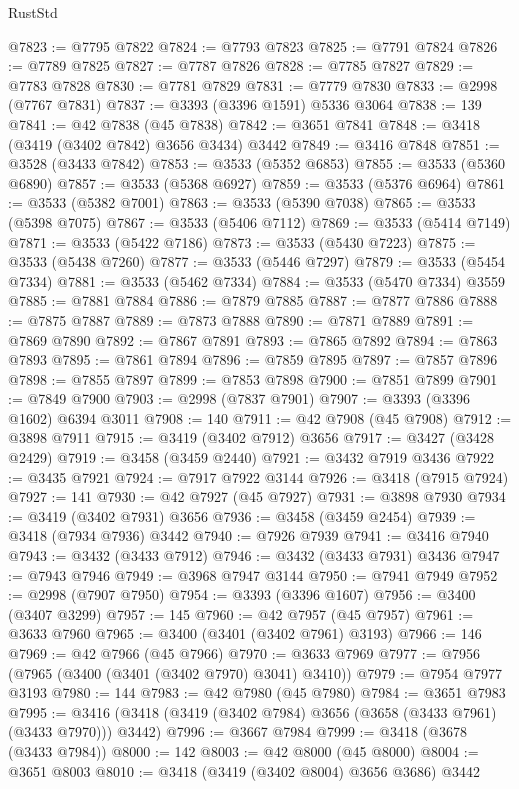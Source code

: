 \begin{lexlean}{RustStd}
\begin{coremodule}
@7823 := @7795 @7822
@7824 := @7793 @7823
@7825 := @7791 @7824
@7826 := @7789 @7825
@7827 := @7787 @7826
@7828 := @7785 @7827
@7829 := @7783 @7828
@7830 := @7781 @7829
@7831 := @7779 @7830
@7833 := @2998 (@7767 @7831)
@7837 := @3393 (@3396 @1591) @5336 @3064
@7838 := 139
@7841 := @42 @7838 (@45 @7838)
@7842 := @3651 @7841
@7848 := @3418 (@3419 (@3402 @7842) @3656 @3434) @3442
@7849 := @3416 @7848
@7851 := @3528 (@3433 @7842)
@7853 := @3533 (@5352 @6853)
@7855 := @3533 (@5360 @6890)
@7857 := @3533 (@5368 @6927)
@7859 := @3533 (@5376 @6964)
@7861 := @3533 (@5382 @7001)
@7863 := @3533 (@5390 @7038)
@7865 := @3533 (@5398 @7075)
@7867 := @3533 (@5406 @7112)
@7869 := @3533 (@5414 @7149)
@7871 := @3533 (@5422 @7186)
@7873 := @3533 (@5430 @7223)
@7875 := @3533 (@5438 @7260)
@7877 := @3533 (@5446 @7297)
@7879 := @3533 (@5454 @7334)
@7881 := @3533 (@5462 @7334)
@7884 := @3533 (@5470 @7334) @3559
@7885 := @7881 @7884
@7886 := @7879 @7885
@7887 := @7877 @7886
@7888 := @7875 @7887
@7889 := @7873 @7888
@7890 := @7871 @7889
@7891 := @7869 @7890
@7892 := @7867 @7891
@7893 := @7865 @7892
@7894 := @7863 @7893
@7895 := @7861 @7894
@7896 := @7859 @7895
@7897 := @7857 @7896
@7898 := @7855 @7897
@7899 := @7853 @7898
@7900 := @7851 @7899
@7901 := @7849 @7900
@7903 := @2998 (@7837 @7901)
@7907 := @3393 (@3396 @1602) @6394 @3011
@7908 := 140
@7911 := @42 @7908 (@45 @7908)
@7912 := @3898 @7911
@7915 := @3419 (@3402 @7912) @3656
@7917 := @3427 (@3428 @2429)
@7919 := @3458 (@3459 @2440)
@7921 := @3432 @7919 @3436
@7922 := @3435 @7921
@7924 := @7917 @7922 @3144
@7926 := @3418 (@7915 @7924)
@7927 := 141
@7930 := @42 @7927 (@45 @7927)
@7931 := @3898 @7930
@7934 := @3419 (@3402 @7931) @3656
@7936 := @3458 (@3459 @2454)
@7939 := @3418 (@7934 @7936) @3442
@7940 := @7926 @7939
@7941 := @3416 @7940
@7943 := @3432 (@3433 @7912)
@7946 := @3432 (@3433 @7931) @3436
@7947 := @7943 @7946
@7949 := @3968 @7947 @3144
@7950 := @7941 @7949
@7952 := @2998 (@7907 @7950)
@7954 := @3393 (@3396 @1607)
@7956 := @3400 (@3407 @3299)
@7957 := 145
@7960 := @42 @7957 (@45 @7957)
@7961 := @3633 @7960
@7965 := @3400 (@3401 (@3402 @7961) @3193)
@7966 := 146
@7969 := @42 @7966 (@45 @7966)
@7970 := @3633 @7969
@7977 := @7956 (@7965 (@3400 (@3401 (@3402 @7970) @3041) @3410))
@7979 := @7954 @7977 @3193
@7980 := 144
@7983 := @42 @7980 (@45 @7980)
@7984 := @3651 @7983
@7995 := @3416 (@3418 (@3419 (@3402 @7984) @3656 (@3658 (@3433 @7961) (@3433 @7970))) @3442)
@7996 := @3667 @7984
@7999 := @3418 (@3678 (@3433 @7984))
@8000 := 142
@8003 := @42 @8000 (@45 @8000)
@8004 := @3651 @8003
@8010 := @3418 (@3419 (@3402 @8004) @3656 @3686) @3442

\end{coremodule}
\end{lexlean}
